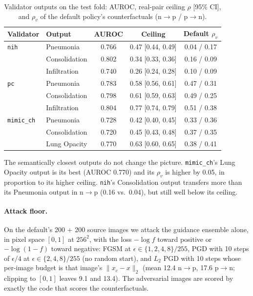 \begin{table}[t]
\centering
\caption{Validator outputs on the test fold: AUROC, real-pair ceiling $\rho$ [95\% CI], and $\rho_v$ of the default policy's counterfactuals (n$\to$p / p$\to$n).}
\label{tab:suppl-heads}
\scriptsize
\setlength{\tabcolsep}{3pt}
\begin{tabular}{@{}llccc@{}}
\toprule
Validator & Output & AUROC & Ceiling & Default $\rho_v$ \\
\midrule
\texttt{nih} & Pneumonia & 0.766 & 0.47 [0.44, 0.49] & 0.04 / 0.17 \\
& Consolidation & 0.802 & 0.34 [0.33, 0.36] & 0.16 / 0.09 \\
& Infiltration & 0.740 & 0.26 [0.24, 0.28] & 0.10 / 0.09 \\
\texttt{pc} & Pneumonia & 0.783 & 0.58 [0.56, 0.61] & 0.47 / 0.31 \\
& Consolidation & 0.798 & 0.61 [0.59, 0.63] & 0.49 / 0.25 \\
& Infiltration & 0.804 & 0.77 [0.74, 0.79] & 0.51 / 0.38 \\
\texttt{mimic\_ch} & Pneumonia & 0.728 & 0.42 [0.40, 0.45] & 0.33 / 0.36 \\
& Consolidation & 0.720 & 0.45 [0.43, 0.48] & 0.37 / 0.35 \\
& Lung Opacity & 0.770 & 0.63 [0.60, 0.65] & 0.38 / 0.41 \\
\bottomrule
\end{tabular}
\end{table}

The semantically closest outputs do not change the picture. \texttt{mimic\_ch}'s Lung Opacity output is its best (AUROC 0.770) and its $\rho_v$ is higher by 0.05, in proportion to its higher ceiling. \texttt{nih}'s Consolidation output transfers more than its Pneumonia output in n$\to$p (0.16 vs.\ 0.04), but still well below its ceiling.

\paragraph{Attack floor.} On the default's 200 + 200 source images we attack the guidance ensemble alone, in pixel space $[0,1]$ at $256^2$, with the loss $-\log f$ toward positive or $-\log(1 - f)$ toward negative: FGSM at $\epsilon \in \{1, 2, 4, 8\}/255$, PGD with 10 steps of $\epsilon/4$ at $\epsilon \in \{2, 4, 8\}/255$ (no random start), and $L_2$ PGD with 10 steps whose per-image budget is that image's $\|x_c - x\|_2$ (mean 12.4 n$\to$p, 17.6 p$\to$n; clipping to $[0,1]$ leaves 9.1 and 13.4). The adversarial images are scored by exactly the code that scores the counterfactuals.

